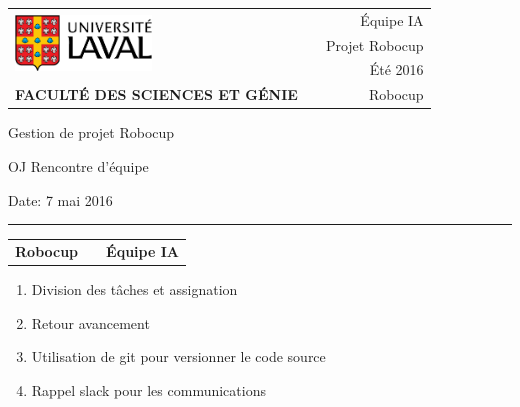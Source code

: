 \documentclass[12pt,letterpaper,twoside]{article}
\begin{document}
\setcounter{secnumdepth}{0}
\begin{titlepage}

	\vspace*{1cm}
	\begin{small}
		\begin{tabularx}{\textwidth}{ l X r }
			\multirow{3}{*}{\includegraphics[height=1.5cm,keepaspectratio]{ul_logo.pdf}}
			&& \'Equipe IA\\
   && Projet Robocup\\
   && Été 2016\\

			\scriptsize{\textbf{FACULTÉ DES SCIENCES ET GÉNIE}} && Robocup
		\end{tabularx}
	\end{small}

	\vfill

	\begin{center}

		Gestion de projet Robocup

		\vspace{0.5cm}

		OJ Rencontre d'\'equipe

		\vspace{2cm}

	\end{center}

	\vfill

	Date: 7 mai 2016

	\vspace{0.4cm}

	\rule{\textwidth}{2pt}

	\vspace{0.3cm}

	\begin{tabularx}{\textwidth}{ l X r }

		\textbf{Robocup} && \textbf{\'Equipe IA} \\

	\end{tabularx}


\end{titlepage}

\begin{enumerate}
	\item Division des tâches et assignation
	\item Retour avancement
	\item Utilisation de git pour versionner le code source
	\item Rappel slack pour les communications
\end{enumerate}
\end{document}
